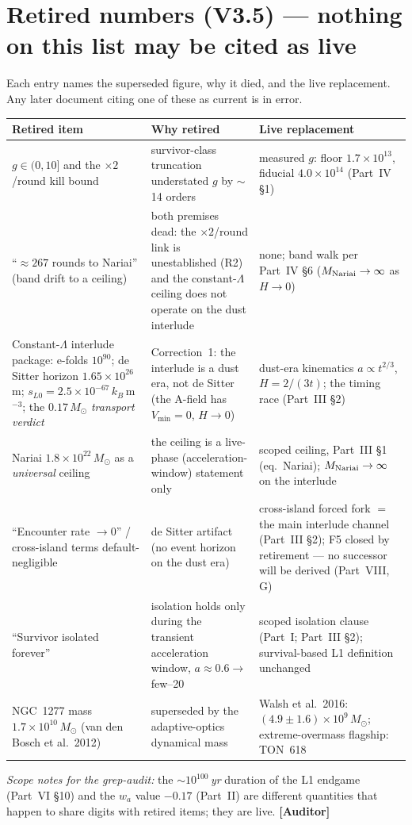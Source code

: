 \documentclass[11pt]{article}
\newcommand{\Auditor}{\textbf{\textcolor{teal!55!black}{[Auditor]}}}
\begin{document}
\section{Retired numbers (V3.5) --- nothing on this list may be cited as live}
Each entry names the superseded figure, why it died, and the live replacement. Any later document citing one of these as current is in error.
\begin{center}\small
\begin{tabular}{@{}p{}p{}p{}@{}}\toprule
\textbf{Retired item} & \textbf{Why retired} & \textbf{Live replacement}\\\midrule
$g\in(0,10]$ and the $\times2$/round kill bound & survivor-class truncation understated $g$ by $\sim$14 orders & measured $g$: floor $1.7\times10^{13}$, fiducial $4.0\times10^{14}$ (Part~IV \S1)\\
``$\approx267$ rounds to Nariai'' (band drift to a ceiling) & both premises dead: the $\times2$/round link is unestablished (R2) and the constant-$\Lambda$ ceiling does not operate on the dust interlude & none; band walk per Part~IV \S6 ($M_{\rm Nariai}\to\infty$ as $H\to0$)\\
Constant-$\Lambda$ interlude package: e-folds $10^{90}$; de Sitter horizon $1.65\times10^{26}$\,m; $s_{L0}=2.5\times10^{-67}\,k_B\,$m$^{-3}$; the $0.17\,M_\odot$ \emph{transport verdict} & Correction~1: the interlude is a dust era, not de Sitter (the A-field has $V_{\min}=0$, $H\to0$) & dust-era kinematics $a\propto t^{2/3}$, $H=2/(3t)$; the timing race (Part~III \S2)\\
Nariai $1.8\times10^{22}\,M_\odot$ as a \emph{universal} ceiling & the ceiling is a live-phase (acceleration-window) statement only & scoped ceiling, Part~III \S1 (eq.\ Nariai); $M_{\rm Nariai}\to\infty$ on the interlude\\
``Encounter rate $\to0$'' / cross-island terms default-negligible & de Sitter artifact (no event horizon on the dust era) & cross-island forced fork $=$ the main interlude channel (Part~III \S2); F5 closed by retirement --- no successor will be derived (Part~VIII, G)\\
``Survivor isolated forever'' & isolation holds only during the transient acceleration window, $a\approx0.6\to$ few--20 & scoped isolation clause (Part~I; Part~III \S2); survival-based L1 definition unchanged\\
NGC~1277 mass $1.7\times10^{10}\,M_\odot$ (van den Bosch et al.\ 2012) & superseded by the adaptive-optics dynamical mass & Walsh et al.\ 2016: $(4.9\pm1.6)\times10^{9}\,M_\odot$; extreme-overmass flagship: TON~618\\\bottomrule
\end{tabular}\end{center}
\emph{Scope notes for the grep-audit:} the $\sim\!10^{100}$\,\emph{yr} duration of the L1 endgame (Part~VI \S10) and the $w_a$ value $-0.17$ (Part~II) are different quantities that happen to share digits with retired items; they are live. \Auditor
\end{document}
